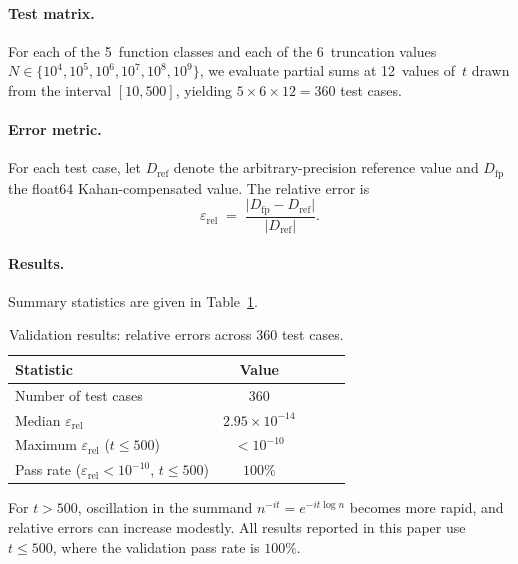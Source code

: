 \documentclass[11pt]{amsart}
\theoremstyle{definition}
\theoremstyle{remark}
\newcommand{\abs}[1]{\lvert #1 \rvert}
\begin{document}
\paragraph{Test matrix.}
For each of the 5~function classes and each of the
6~truncation values $N \in \{10^4, 10^5, 10^6, 10^7, 10^8, 10^9\}$,
we evaluate partial sums at 12~values of~$t$ drawn from the interval
$[10, 500]$, yielding $5 \times 6 \times 12 = 360$ test cases.

\paragraph{Error metric.}
For each test case, let $D_{\mathrm{ref}}$ denote the
arbitrary-precision reference value and $D_{\mathrm{fp}}$ the
float64 Kahan-compensated value.  The relative error is
\begin{equation}
  \varepsilon_{\mathrm{rel}} \;=\;
  \frac{\abs{D_{\mathrm{fp}} - D_{\mathrm{ref}}}}
       {\abs{D_{\mathrm{ref}}}}.
\end{equation}

\paragraph{Results.}  Summary statistics are given in
Table~\ref{tab:validation}.

\begin{table}[ht]
\centering
\caption{Validation results: relative errors across 360 test cases.}
\label{tab:validation}
\begin{tabular}{@{}lcccc@{}}
\toprule
Statistic & Value \\
\midrule
Number of test cases     & 360 \\
Median $\varepsilon_{\mathrm{rel}}$ & $2.95 \times 10^{-14}$ \\
Maximum $\varepsilon_{\mathrm{rel}}$ ($t \le 500$) &
  $< 10^{-10}$ \\
Pass rate ($\varepsilon_{\mathrm{rel}} < 10^{-10}$, $t \le 500$) &
  $100\%$ \\
\bottomrule
\end{tabular}
\end{table}

For $t > 500$, oscillation in the summand $n^{-it} = e^{-it\log n}$
becomes more rapid, and relative errors can increase modestly.  All
results reported in this paper use $t \le 500$, where the validation
pass rate is $100\%$.
\end{document}
